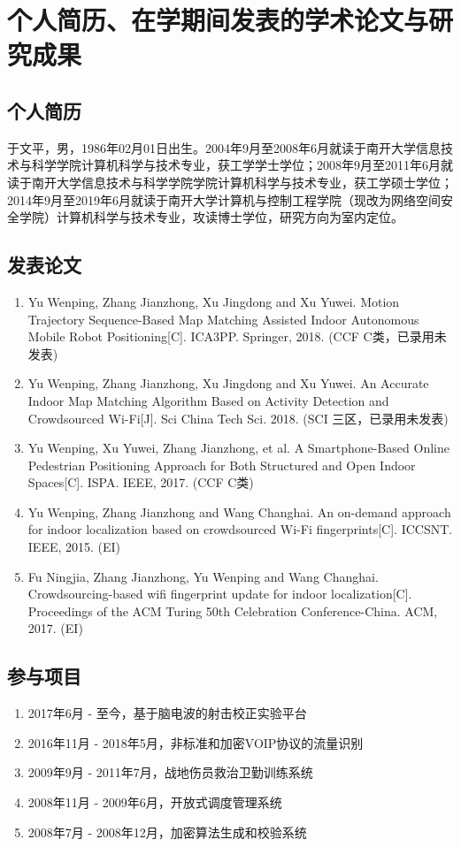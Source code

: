 

\chapter*{个人简历、在学期间发表的学术论文与研究成果}
\section*{个人简历}
于文平，男，1986年02月01日出生。2004年9月至2008年6月就读于南开大学信息技术与科学学院计算机科学与技术专业，获工学学士学位；2008年9月至2011年6月就读于南开大学信息技术与科学学院学院计算机科学与技术专业，获工学硕士学位；2014年9月至2019年6月就读于南开大学计算机与控制工程学院（现改为网络空间安全学院）计算机科学与技术专业，攻读博士学位，研究方向为室内定位。
\section*{发表论文}
\begin{enumerate}
\renewcommand{\labelenumi}{[\theenumi]}
\item Yu Wenping, Zhang Jianzhong, Xu Jingdong and Xu Yuwei. Motion Trajectory Sequence-Based Map Matching Assisted Indoor Autonomous Mobile Robot Positioning[C]. ICA3PP. Springer, 2018. (CCF C类，已录用未发表)
\item Yu Wenping, Zhang Jianzhong, Xu Jingdong and Xu Yuwei. An Accurate Indoor Map Matching Algorithm Based on Activity Detection and Crowdsourced Wi-Fi[J]. Sci China Tech Sci. 2018. (SCI 三区，已录用未发表)
\item Yu Wenping, Xu Yuwei, Zhang Jianzhong, et al. A Smartphone-Based Online Pedestrian Positioning Approach for Both Structured and Open Indoor Spaces[C]. ISPA. IEEE, 2017. (CCF C类)
\item Yu Wenping, Zhang Jianzhong and Wang Changhai. An on-demand approach for indoor localization based on crowdsourced Wi-Fi fingerprints[C]. ICCSNT. IEEE, 2015. (EI)
\item Fu Ningjia, Zhang Jianzhong, Yu Wenping and Wang Changhai. Crowdsourcing-based wifi fingerprint update for indoor localization[C]. Proceedings of the ACM Turing 50th Celebration Conference-China. ACM, 2017. (EI)
\end{enumerate}
\section*{参与项目}
\begin{enumerate}
\renewcommand{\labelenumi}{[\theenumi]}
\item 2017年6月 - 至今，基于脑电波的射击校正实验平台
\item 2016年11月 - 2018年5月，非标准和加密VOIP协议的流量识别
\item 2009年9月 - 2011年7月，战地伤员救治卫勤训练系统
\item 2008年11月 - 2009年6月，开放式调度管理系统
\item 2008年7月 - 2008年12月，加密算法生成和校验系统
\end{enumerate}
